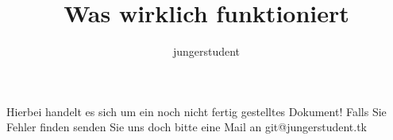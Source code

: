 \documentclass[ebook,12pt,oneside,openany]{memoir}
\title{Was wirklich funktioniert}
\author{jungerstudent}
\begin{document}
\maketitle
Hierbei handelt es sich um ein noch nicht fertig gestelltes Dokument! Falls Sie Fehler finden senden Sie uns doch bitte eine Mail an git@jungerstudent.tk
\newpage



%
%
 

\end{document}
